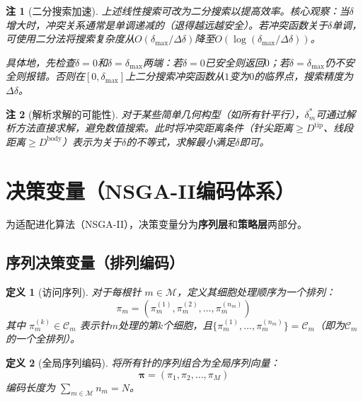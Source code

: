 \documentclass[11pt,a4paper]{article}
\newtheorem{definition}{定义}[section]
\newtheorem{remark}{注}[section]
\begin{document}
\begin{remark}[二分搜索加速]
上述线性搜索可改为二分搜索以提高效率。核心观察：当$\delta$增大时，冲突关系通常是单调递减的（退得越远越安全）。若冲突函数关于$\delta$单调，可使用二分法将搜索复杂度从$O(\delta_{\max}/\Delta\delta)$降至$O(\log(\delta_{\max}/\Delta\delta))$。

具体地，先检查$\delta = 0$和$\delta = \delta_{\max}$两端：若$\delta = 0$已安全则返回$0$；若$\delta = \delta_{\max}$仍不安全则报错。否则在$[0, \delta_{\max}]$上二分搜索冲突函数从$1$变为$0$的临界点，搜索精度为$\Delta\delta$。
\end{remark}

\begin{remark}[解析求解的可能性]
对于某些简单几何构型（如所有针平行），$\delta_m^*$可通过解析方法直接求解，避免数值搜索。此时将冲突距离条件（针尖距离$\geq D^{\text{tip}}$、线段距离$\geq D^{\text{body}}$）表示为关于$\delta$的不等式，求解最小满足$\delta$即可。
\end{remark}

\section{决策变量（NSGA-II编码体系）}

为适配进化算法（NSGA-II），决策变量分为\textbf{序列层}和\textbf{策略层}两部分。

\subsection{序列决策变量（排列编码）}

\begin{definition}[访问序列]
对于每根针 $m \in \mathcal{M}$，定义其细胞处理顺序为一个排列：
\begin{equation}
    \pi_m = (\pi_m^{(1)}, \pi_m^{(2)}, \ldots, \pi_m^{(n_m)})
\end{equation}
其中 $\pi_m^{(k)} \in \mathcal{C}_m$ 表示针$m$处理的第$k$个细胞，且$\{\pi_m^{(1)}, \ldots, \pi_m^{(n_m)}\} = \mathcal{C}_m$（即为$\mathcal{C}_m$的一个全排列）。
\end{definition}

\begin{definition}[全局序列编码]
将所有针的序列组合为全局序列向量：
\begin{equation}
    \boldsymbol{\pi} = (\pi_1, \pi_2, \ldots, \pi_M)
\end{equation}
编码长度为 $\sum_{m \in \mathcal{M}} n_m = N$。
\end{definition}
\end{document}
